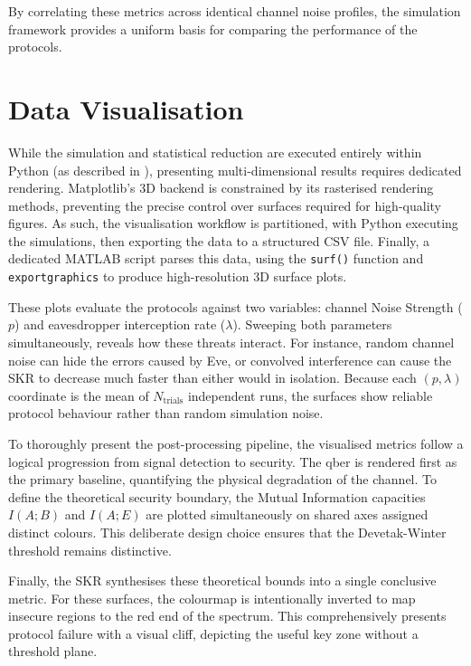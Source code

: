 By correlating these metrics across identical channel noise profiles, the simulation framework provides a uniform basis for comparing the performance of the protocols.


\section{Data Visualisation}
\label{sec:dataviz}

While the simulation and statistical reduction are executed entirely within Python (as described in ), presenting multi-dimensional results requires dedicated rendering. Matplotlib's 3D backend is constrained by its rasterised rendering methods, preventing the precise control over surfaces required for high-quality figures. As such, the visualisation workflow is partitioned, with Python executing the simulations, then exporting the data to a structured CSV file. Finally, a dedicated MATLAB script parses this data, using the \texttt{surf()} function and \texttt{exportgraphics} to produce high-resolution 3D surface plots.

These plots evaluate the protocols against two variables: channel Noise Strength (\(p\)) and eavesdropper interception rate (\(\lambda\)). Sweeping both parameters simultaneously, reveals how these threats interact. For instance, random channel noise can hide the errors caused by Eve, or convolved interference can cause the SKR to decrease much faster than either would in isolation. Because each \((p, \lambda)\) coordinate is the mean of \(N_{\text{trials}}\) independent runs, the surfaces show reliable protocol behaviour rather than random simulation noise.

To thoroughly present the post-processing pipeline, the visualised metrics follow a logical progression from signal detection to security. The \gls{qber} is rendered first as the primary baseline, quantifying the physical degradation of the channel. To define the theoretical security boundary, the Mutual Information capacities \(I(A;B)\) and \(I(A;E)\) are plotted simultaneously on shared axes assigned distinct colours. This deliberate design choice ensures that the Devetak-Winter threshold remains distinctive.

Finally, the SKR synthesises these theoretical bounds into a single conclusive metric. For these surfaces, the colourmap is intentionally inverted to map insecure regions to the red end of the spectrum. This comprehensively presents protocol failure with a visual cliff, depicting the useful key zone without a threshold plane.


